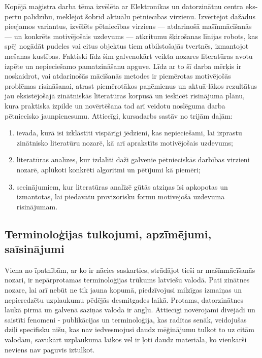 \documentclass[12pt, a4paper]{article}
\numberwithin{equation}{section} %
\begin{document}
Kopējā maģistra darba tēma izvēlēta ar Elektronikas un datorzinātņu centra eks-pertu palīdzību, meklējot šobrīd aktuālu pētniecības virzienu. Izvērtējot dažādus pieejamos variantus, izvēlēts pētniecības virziens --- atdarinošā mašīnmācīšanās --- un konkrēts motivējošais uzdevums --- atkritumu šķirošanas līnijas robots, kas spēj nogādāt pudeles vai citus objektus tiem atbilstošajās tvertnēs, izmantojot mešanas kustības. Faktiski līdz šim galvenokārt veikta nozares literatūras avotu izpēte un nepieciešamo pamatzināšanu apguve. Līdz ar to šī darba mērķis ir noskaidrot, vai atdarinošās mācīšanās metodes ir piemērotas motivējošās problēmas risināšanai, atrast piemērotākos paņēmienus un aktuā-lākos rezultātus jau eksistējošajā zinātniskās literatūras korpusā un ieskicēt risinājuma plānu, kura praktiska izpilde un novērtēšana tad arī veidotu noslēguma darba pētniecisko jaunpienesumu. Attiecīgi, kursadarbs sastāv no trijām daļām:
\begin{enumerate}
    \item ievada, kurā īsi izklāstīti vispārīgi jēdzieni, kas nepieciešami, lai izprastu zinātnisko literatūru nozarē, kā arī aprakstīts motivējošais uzdevums;
    \item literatūras analīzes, kur izdalīti daži galvenie pētnieciskās darbības virzieni nozarē, aplūkoti konkrēti algoritmi un pētījumi kā piemēri;
    \item secinājumiem, kur literatūras analīzē gūtās atziņas īsi apkopotas un izmantotas, lai piedāvātu provizorisku formu motivējošā uzdevuma risinājumam.
\end{enumerate}


\subsection{Terminoloģijas tulkojumi, apzīmējumi, saīsinājumi}

Viena no īpatnībām, ar ko ir nācies saskarties, strādājot tieši ar mašīnmācīšanās nozari, ir nepārprotamas terminoloģijas trūkums latviešu valodā. Pati zinātnes nozare, lai arī nebūt ne tik jauna kopumā, piedzīvojusi milzīgas izmaiņas un nepieredzētu uzplaukumu pēdējās desmitgades laikā. Protams, datorzinātnes laukā pirmā un galvenā saziņas valoda ir angļu. Attiecīgi novērojami divējādi un saistīti fenomeni - publikācijas un terminoloģija, kas radītas senāk, veidojušas dziļi specifisku nišu, kas nav iedvesmojusi daudz mēģinājumu tulkot to uz citām valodām, savukārt uzplaukuma laikos vēl ir ļoti daudz materiāla, ko vienkārši neviens nav paguvis iztulkot.
\end{document}
